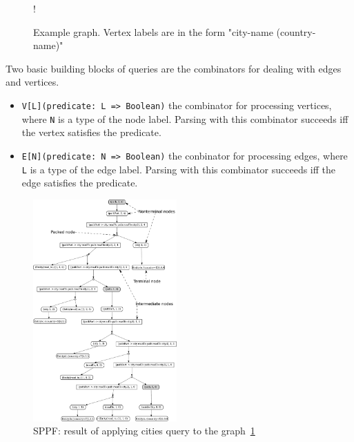 
\begin{figure}[h]
 {!}
{
}
\caption{Example graph. Vertex labels are in the form "city-name (country-name)"}
\label{fig:graph}
\end{figure}

Two basic building blocks of queries are the combinators for dealing with edges and vertices.
\begin{itemize}
    \item \lstinline{V[L](predicate: L => Boolean)} the combinator for processing vertices, where \lstinline{N} is a type of the node label. 
    Parsing with this combinator succeeds iff the vertex satisfies the predicate.
    \item \lstinline{E[N](predicate: N => Boolean)} the conbinator for processing edges, where \lstinline{L} is a type of the edge label. 
    Parsing with this combinator succeeds iff the edge satisfies the predicate.  
\end{itemize}

\begin{figure}[h]
\includegraphics[width=0.49\textwidth]{sppf}
\caption{SPPF: result of applying cities query to the graph~\ref{fig:graph}}
\label{fig:sppf}
\end{figure}

